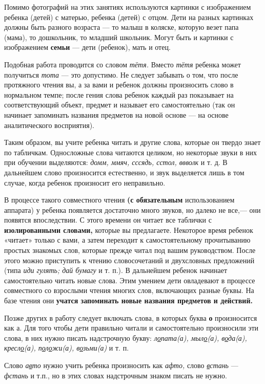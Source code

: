 \documentclass[a5paper]{book}
\renewcommand{\emph}[1]{\textit{#1}}
\begin{document}
Помимо фотографий на этих занятиях используются картинки с изображением
ребенка (детей) с матерью, ребенка (детей) с отцом. Дети на разных
картинках должны быть разного возраста --- то малыш в коляске, которую
везет папа (мама), то дошкольник, то младший школьник. Могут быть и
картинки с изображением \textbf{семьи} --- дети (ребенок), мать и отец.

Подобная работа проводится со словом \emph{тётя.} Вместо \emph{тётя}
ребенка может получиться \emph{тота} --- это допустимо. Не следует
забывать о том, что после протяжного чтения вы, а за вами и ребенок
должны произносить слово в нормальном темпе; после гения слова ребенок
каждый раз показывает на соответствующий объект, предмет и называет его
самостоятельно (так он начинает запоминать названия предметов на новой
основе --- на основе аналитического восприятия).

Таким образом, вы учите ребенка читать и другие слова, которые он твердо
знает по табличкам. Односложные слова читаются целиком, но некоторые
звуки в них при обучении выделяются: \emph{домм, ммяч, сссядь, сстол,
ввволк} и т. д. В дальнейшем слово произносится естественно, и звук
выделяется лишь в том случае, когда ребенок произносит его неправильно.

В процессе такого совместного чтения \textbf{(с обязательным}
использованием аппарата) у ребенка появляется достаточно много звуков,
но далеко не все,--- они появятся впоследствии. С этого времени он
читает все таблички с \textbf{изолированными словами,} которые вы
предлагаете. Некоторое время ребенок «читает» только с вами, а затем
переходит к самостоятельному прочитыванию простых знакомых слов, которые
прежде читал под вашим руководством. После этого можно приступить к
чтению словосочетаний и двухсловных предложений (типа \emph{иди гулять;
дай бумагу} и т. п.). В дальнейшем ребенок начинает самостоятельно
читать новые слова. Этим умением дети овладевают в процессе совместного
со взрослыми чтения многих слов, включающих разные буквы. На базе чтения
они \textbf{учатся запоминать новые названия предметов и действий.}

Позже других в работу следует включать слова, в которых буква \textbf{о}
произносится как а. Для того чтобы дети правильно читали и
самостоятельно произносили эти слова, в них нужно писать надстрочную
букву: \emph{л\uline{о}пата(а), мыл\uline{о}(а), в\uline{о}да(а),
кресл\uline{о}(а), п\uline{о}л\uline{о}жи(а), в\uline{о}зьми(а)} и т. п.

Слово \emph{а\uline{в}то} нужно учить ребенка произносить как
\emph{афто,} слово \emph{\uline{в}стань} --- \emph{фстань} и т.п., но в
этих словах надстрочным знаком писать не нужно.
\end{document}
